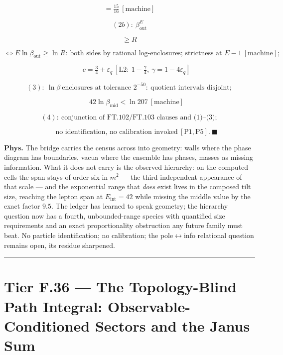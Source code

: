 \begin{theorem}
\[
= \tfrac{15}{16}\ [\text{machine}]
\]

\[
(2b):\ \beta_{\mathrm{out}}^E
\]

\[
\ge R
\]

\[
\iff E\ln\beta_{\mathrm{out}}\ge\ln R:\ \text{both sides by rational log-enclosures; strictness at }E-1\ [\text{machine}];
\]

\[
\qquad c=\tfrac34+\varepsilon_q\ [\mathrm{L2}:\ 1-\tfrac\gamma4,\ \gamma=1-4\varepsilon_q]
\]

\[
(3):\ \ln\beta\ \text{enclosures at tolerance }2^{-50}:\ \text{quotient intervals disjoint};
\]

\[
\qquad 42\ln\beta_{\mathrm{mid}}<\ln207\ [\text{machine}]
\]

\[
(4):\ \text{conjunction of FT.102/FT.103 clauses and (1)–(3)};
\]

\[
\qquad \text{no identification, no calibration invoked}\ [\mathrm{P1},\mathrm{P5}].\ \blacksquare
\]

\textbf{Phys.} The bridge carries the census across into geometry: walls where the phase diagram has boundaries, vacua where the ensemble has phases, masses as missing information. What it does not carry is the observed hierarchy: on the computed cells the span stays of order six in $m^2$ — the third independent appearance of that scale — and the exponential range that \textit{does} exist lives in the composed tilt size, reaching the lepton span at $E_{\mathrm{int}}=42$ while missing the middle value by the exact factor $9.5$. The ledger has learned to speak geometry; the hierarchy question now has a fourth, unbounded-range species with quantified size requirements and an exact proportionality obstruction any future family must beat. No particle identification; no calibration; the pole$\leftrightarrow$info relational question remains open, its residue sharpened.

\vspace{2pt}\noindent\rule{\textwidth}{0.4pt}\vspace{2pt}

\end{theorem}

\section[Tier F.36 — The Topology-Blind Path Integral:…]{\texorpdfstring{Tier F.36 — The Topology-Blind Path Integral: Observable-Conditioned Sectors and the Janus Sum}{Tier F.36 - The Topology-Blind Path Integral: Observable-Conditioned Sectors and the Janus Sum}}

